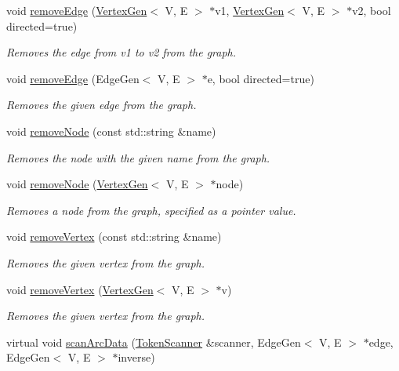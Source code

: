 \begin{DoxyCompactItemize}
void \mbox{\hyperlink{classBasicGraphGen_a8b1003fbe63fab20173526459fff4139}{remove\+Edge}} (\mbox{\hyperlink{classVertexGen}{Vertex\+Gen}}$<$ V, E $>$ $\ast$v1, \mbox{\hyperlink{classVertexGen}{Vertex\+Gen}}$<$ V, E $>$ $\ast$v2, bool directed=true)
\begin{DoxyCompactList}\small\item\em Removes the edge from v1 to v2 from the graph. \end{DoxyCompactList}\item 
void \mbox{\hyperlink{classBasicGraphGen_a2c6bb1e8e2c18b7376504692f7baae62}{remove\+Edge}} (Edge\+Gen$<$ V, E $>$ $\ast$e, bool directed=true)
\begin{DoxyCompactList}\small\item\em Removes the given edge from the graph. \end{DoxyCompactList}\item 
void \mbox{\hyperlink{classGraph_a2d5f7ee89176144ed4c5c6b08a233aa6}{remove\+Node}} (const std\+::string \&name)
\begin{DoxyCompactList}\small\item\em Removes the node with the given name from the graph. \end{DoxyCompactList}\item 
void \mbox{\hyperlink{classGraph_a2dfe63019975561914e0ed79551de108}{remove\+Node}} (\mbox{\hyperlink{classVertexGen}{Vertex\+Gen}}$<$ V, E $>$ $\ast$node)
\begin{DoxyCompactList}\small\item\em Removes a node from the graph, specified as a pointer value. \end{DoxyCompactList}\item 
void \mbox{\hyperlink{classBasicGraphGen_aaa33b4c05ee490d241ba5542420b985b}{remove\+Vertex}} (const std\+::string \&name)
\begin{DoxyCompactList}\small\item\em Removes the given vertex from the graph. \end{DoxyCompactList}\item 
void \mbox{\hyperlink{classBasicGraphGen_a9eac2d17b5e8074dace019020d078acb}{remove\+Vertex}} (\mbox{\hyperlink{classVertexGen}{Vertex\+Gen}}$<$ V, E $>$ $\ast$v)
\begin{DoxyCompactList}\small\item\em Removes the given vertex from the graph. \end{DoxyCompactList}\item 
virtual void \mbox{\hyperlink{classBasicGraphGen_a4314b3b6bda0755a87e49070edd17c3d}{scan\+Arc\+Data}} (\mbox{\hyperlink{classTokenScanner}{Token\+Scanner}} \&scanner, Edge\+Gen$<$ V, E $>$ $\ast$edge, Edge\+Gen$<$ V, E $>$ $\ast$inverse)

\end{DoxyCompactItemize}
